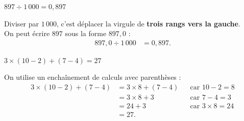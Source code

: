 \documentclass[answers]{exam}
\begin{document}
\begin{questions}
  \question $897 \div 1\,000 = \boxed{0{,}897}$

  \begin{solution}
  Diviser par $1\,000$, c'est déplacer la virgule de \textbf{trois rangs vers la gauche}. \\
  On peut écrire $897$ sous la forme $897{,}0$ :
  \begin{align*}
    897{,}0 \div 1\,000 &= 0{,}897.
  \end{align*}
  \end{solution}

  \question $3 \times (10 - 2) + (7 - 4) = \boxed{27}$

  \begin{solution}
  On utilise un enchaînement de calculs avec parenthèses :
  \begin{align*}
    3 \times (10 - 2) + (7 - 4)
      &= 3 \times 8 + (7 - 4) &&\text{car } 10 - 2 = 8 \\
      &= 3 \times 8 + 3 &&\text{car } 7 - 4 = 3 \\
      &= 24 + 3 &&\text{car } 3 \times 8 = 24 \\
      &= 27.
  \end{align*}
  \end{solution}

\end{questions}
\end{document}
